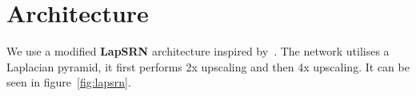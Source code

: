 \documentclass{scrartcl}
\begin{document}





\section{Architecture}
We use a modified \textbf{LapSRN} architecture inspired by~\cite{LapSRN}.
The network utilises a Laplacian pyramid, it first performs 2x upscaling and then 4x upscaling.
It can be seen in figure~\cref{fig:lapsrn}.
\end{document}
